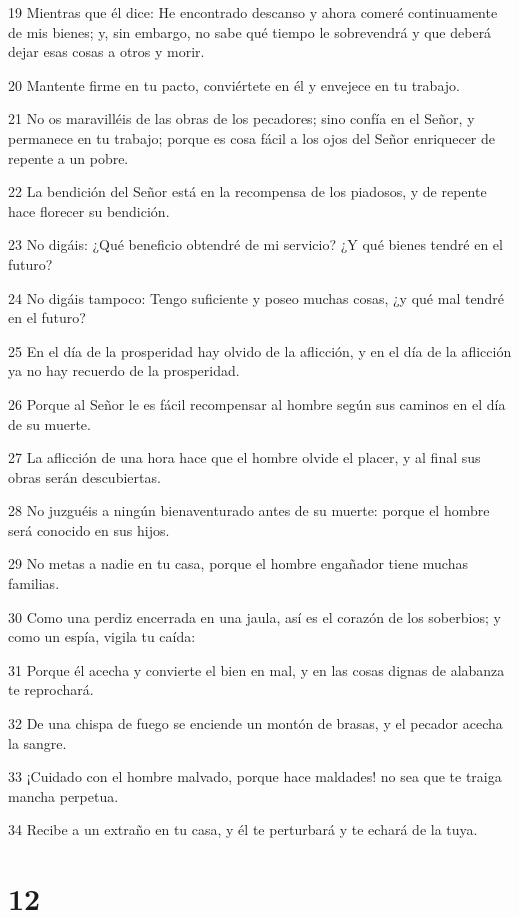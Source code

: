 \par 19 Mientras que él dice: He encontrado descanso y ahora comeré continuamente de mis bienes; y, sin embargo, no sabe qué tiempo le sobrevendrá y que deberá dejar esas cosas a otros y morir.
\par 20 Mantente firme en tu pacto, conviértete en él y envejece en tu trabajo.
\par 21 No os maravilléis de las obras de los pecadores; sino confía en el Señor, y permanece en tu trabajo; porque es cosa fácil a los ojos del Señor enriquecer de repente a un pobre.
\par 22 La bendición del Señor está en la recompensa de los piadosos, y de repente hace florecer su bendición.
\par 23 No digáis: ¿Qué beneficio obtendré de mi servicio? ¿Y qué bienes tendré en el futuro?
\par 24 No digáis tampoco: Tengo suficiente y poseo muchas cosas, ¿y qué mal tendré en el futuro?
\par 25 En el día de la prosperidad hay olvido de la aflicción, y en el día de la aflicción ya no hay recuerdo de la prosperidad.
\par 26 Porque al Señor le es fácil recompensar al hombre según sus caminos en el día de su muerte.
\par 27 La aflicción de una hora hace que el hombre olvide el placer, y al final sus obras serán descubiertas.
\par 28 No juzguéis a ningún bienaventurado antes de su muerte: porque el hombre será conocido en sus hijos.
\par 29 No metas a nadie en tu casa, porque el hombre engañador tiene muchas familias.
\par 30 Como una perdiz encerrada en una jaula, así es el corazón de los soberbios; y como un espía, vigila tu caída:
\par 31 Porque él acecha y convierte el bien en mal, y en las cosas dignas de alabanza te reprochará.
\par 32 De una chispa de fuego se enciende un montón de brasas, y el pecador acecha la sangre.
\par 33 ¡Cuidado con el hombre malvado, porque hace maldades! no sea que te traiga mancha perpetua.
\par 34 Recibe a un extraño en tu casa, y él te perturbará y te echará de la tuya.

\chapter{12}


